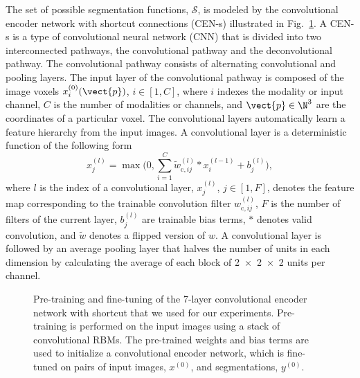 The set of possible segmentation functions, $\mathcal{S}$, is modeled by the
convolutional encoder network with shortcut connections (CEN-s) illustrated in
Fig.~\ref{fig:network}. A CEN-s is a type of convolutional neural network (CNN)
\cite{LeCun1998} that is divided into two interconnected pathways, the
convolutional pathway and the deconvolutional \cite{zeiler2011} pathway. The
convolutional pathway consists of alternating convolutional and pooling layers.
The input layer of the convolutional pathway is composed of the image voxels
$x^{(0)}_i(\vect{p})$, $i \in [1, C]$, where $i$ indexes the modality or input
channel, $C$ is the number of modalities or channels, and $\vect{p} \in \N^3$
are the coordinates of a particular voxel. The convolutional layers
automatically learn a feature hierarchy from the input images. A convolutional
layer is a deterministic function of the following form
\begin{equation}
x^{(l)}_j = \max \Bigg(0, \sum_{i=1}^C\tilde{w}^{(l)}_{\text{c},ij}*x^{(l-1)}_i
+ b^{(l)}_j\Bigg),
\end{equation}
where $l$ is the index of a convolutional layer, $x^{(l)}_j$, $j \in [1,F]$,
denotes the feature map corresponding to the trainable convolution filter
$w^{(l)}_{\text{c},ij}$, $F$ is the number of filters of the current layer,
$b^{(l)}_j$ are trainable bias terms, $*$ denotes valid convolution, and
$\tilde{w}$ denotes a flipped version of $w$. A convolutional layer is followed
by an average pooling layer \cite{scherer2010} that halves the number
of units in each dimension by calculating the average of each block of
\num{2x2x2} units per channel.

\begin{figure}[tb]
\centering


\caption[Pre-training and fine-tuning of the 7-layer convolutional encoder
network with shortcut]{Pre-training and fine-tuning of the 7-layer convolutional
encoder network with shortcut that we used for our experiments. Pre-training is
performed on the input images using a stack of convolutional RBMs. The
pre-trained weights and bias terms are used to initialize a convolutional
encoder network, which is fine-tuned on pairs of input images, $x^{(0)}$, and
segmentations, $y^{(0)}$.}

\label{fig:network}
\end{figure}

